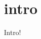 \documentclass[msc,lith,english]{liuthesis}
\author{Edvard Thörnros}
\begin{document}

\chapter{intro}
Intro!
%
%
%
%
%
%
\end{document}
